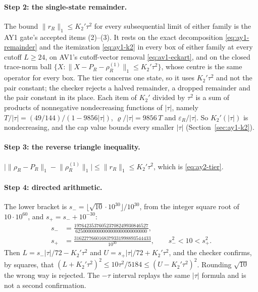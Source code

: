 \paragraph{Step 2: the single-state remainder.}
The bound $\lVert r_R\rVert_1\le K_2'\tau^2$ for every subsequential limit of either
family is the AY1 gate's accepted items (2)--(3). It rests on the exact
decomposition \eqref{eq:ay1-remainder} and the itemization \eqref{eq:ay1-k2}
in every box of either family at every cutoff $L\ge24$, on AV1's
cutoff-vector removal \eqref{eq:av1-eckart}, and on the closed trace-norm
ball $\{X:\lVert X-P_R-\rho^{(1)}_R\rVert_1\le K_2'\tau^2\}$, whose centre is the
same operator for every box. The tier concerns one state, so it uses
$K_2'\tau^2$ and not the pair constant; the checker rejects a halved
remainder, a dropped remainder and the pair constant in its place. Each item
of $K_2'$ divided by $\tau^2$ is a sum of products of nonnegative
nondecreasing functions of $|\tau|$, namely
$T/|\tau|=(49/144)/(1-9856|\tau|)$, $\varrho/|\tau|=9856\,T$ and
$\varepsilon_R/|\tau|$. So $K_2'(|\tau|)$ is nondecreasing, and the cap value
bounds every smaller $|\tau|$ (Section~\ref{sec:ay1-k2}).

\paragraph{Step 3: the reverse triangle inequality.}
$\bigl|\lVert \rho_R-P_R\rVert_1-\lVert \rho^{(1)}_R\rVert_1\bigr|\le\lVert r_R\rVert_1\le
K_2'\tau^2$, which is \eqref{eq:ay2-tier}.

\paragraph{Step 4: directed arithmetic.}
The lower bracket is $s_-=\lfloor\sqrt{10}\cdot10^{30}\rfloor/10^{30}$, from
the integer square root of $10\cdot10^{60}$, and $s_+=s_-+10^{-30}$:
\begin{equation}
 \begin{aligned}
 s_-&=\frac{197642353760523708249930846527}{62500000000000000000000000000},\\
 s_+&=\frac{3162277660168379331998893544433}{10^{30}},\qquad s_-^2<10<s_+^2 .
 \end{aligned}
 \label{eq:ay2-sqrt10}
\end{equation}
Then $L=s_-|\tau|/72-K_2'\tau^2$ and $U=s_+|\tau|/72+K_2'\tau^2$, and the
checker confirms, by squares, that
$(L+K_2'\tau^2)^2\le10\tau^2/5184\le(U-K_2'\tau^2)^2$. Rounding $\sqrt{10}$
the wrong way is rejected. The $-\tau$ interval replays the same $|\tau|$
formula and is not a second confirmation.


